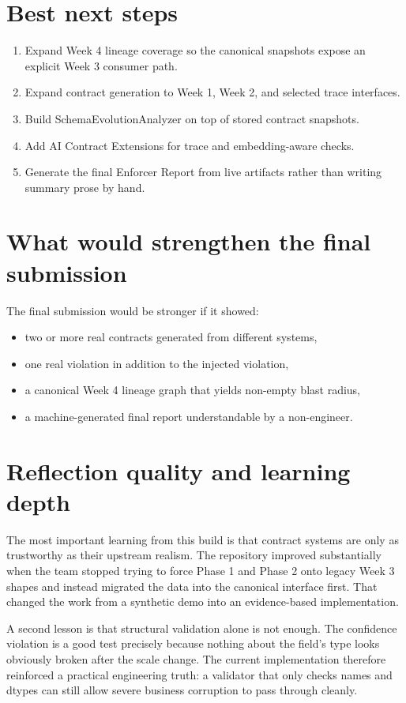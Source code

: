 \documentclass[11pt]{report}
\begin{document}
\section{Best next steps}
\begin{enumerate}[leftmargin=1.6em]
  \item Expand Week 4 lineage coverage so the canonical snapshots expose an explicit Week 3 consumer path.
  \item Expand contract generation to Week 1, Week 2, and selected trace interfaces.
  \item Build SchemaEvolutionAnalyzer on top of stored contract snapshots.
  \item Add AI Contract Extensions for trace and embedding-aware checks.
  \item Generate the final Enforcer Report from live artifacts rather than writing summary prose by hand.
\end{enumerate}

\section{What would strengthen the final submission}
The final submission would be stronger if it showed:

\begin{itemize}[leftmargin=1.5em]
  \item two or more real contracts generated from different systems,
  \item one real violation in addition to the injected violation,
  \item a canonical Week 4 lineage graph that yields non-empty blast radius,
  \item a machine-generated final report understandable by a non-engineer.
\end{itemize}

\section{Reflection quality and learning depth}
The most important learning from this build is that contract systems are only as trustworthy as their upstream realism. The repository improved substantially when the team stopped trying to force Phase 1 and Phase 2 onto legacy Week 3 shapes and instead migrated the data into the canonical interface first. That changed the work from a synthetic demo into an evidence-based implementation.

A second lesson is that structural validation alone is not enough. The confidence violation is a good test precisely because nothing about the field's type looks obviously broken after the scale change. The current implementation therefore reinforced a practical engineering truth: a validator that only checks names and dtypes can still allow severe business corruption to pass through cleanly.
\end{document}

